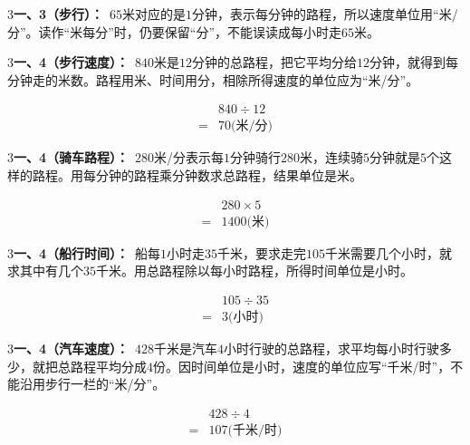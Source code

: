 \documentclass[multi=snippet,border={5bp 20bp 5bp 5bp}]{standalone}
\newenvironment{snippet}[3]{\begin{minipage}{#1bp}\color{answerred}\fontsize{#2}{#3}\selectfont\raggedright}{\end{minipage}}
\begin{document}
\begin{snippet}{505}{11.5}{14}\begin{multicols}{3}\raggedcolumns \textbf{一、3（步行）：}\ \(65\)\allowbreak 米对应的是\(1\)\allowbreak 分钟，表示每分钟的路程，所以速度单位用“米/分”。读作“米每分”时，仍要保留“分”，不能误读成每小时走\(65\)\allowbreak 米。\end{multicols}\end{snippet}
\begin{snippet}{505}{11.5}{14}\begin{multicols}{3}\raggedcolumns \textbf{一、4（步行速度）：}\ \(840\)\allowbreak 米是\(12\)\allowbreak 分钟的总路程，把它平均分给\(12\)\allowbreak 分钟，就得到每分钟走的米数。路程用米、时间用分，相除所得速度的单位应为“米/分”。\par \[\begin{aligned}&840\div12\\={}&70\text{(米/分)}\end{aligned}\]\end{multicols}\end{snippet}
\begin{snippet}{505}{11.5}{14}\begin{multicols}{3}\raggedcolumns \textbf{一、4（骑车路程）：}\ \(280\)\allowbreak 米/分表示每\(1\)\allowbreak 分钟骑行\(280\)\allowbreak 米，连续骑\(5\)\allowbreak 分钟就是\(5\)\allowbreak 个这样的路程。用每分钟的路程乘分钟数求总路程，结果单位是米。\par \[\begin{aligned}&280\times5\\={}&1400\text{(米)}\end{aligned}\]\end{multicols}\end{snippet}
\begin{snippet}{505}{11.5}{14}\begin{multicols}{3}\raggedcolumns \textbf{一、4（船行时间）：}\ 船每\(1\)\allowbreak 小时走\(35\)\allowbreak 千米，要求走完\(105\)\allowbreak 千米需要几个小时，就求其中有几个\(35\)\allowbreak 千米。用总路程除以每小时路程，所得时间单位是小时。\par \[\begin{aligned}&105\div35\\={}&3\text{(小时)}\end{aligned}\]\end{multicols}\end{snippet}
\begin{snippet}{505}{11.5}{14}\begin{multicols}{3}\raggedcolumns \textbf{一、4（汽车速度）：}\ \(428\)\allowbreak 千米是汽车\(4\)\allowbreak 小时行驶的总路程，求平均每小时行驶多少，就把总路程平均分成\(4\)\allowbreak 份。因时间单位是小时，速度的单位应写“千米/时”，不能沿用步行一栏的“米/分”。\par \[\begin{aligned}&428\div4\\={}&107\text{(千米/时)}\end{aligned}\]\end{multicols}\end{snippet}
\end{document}

